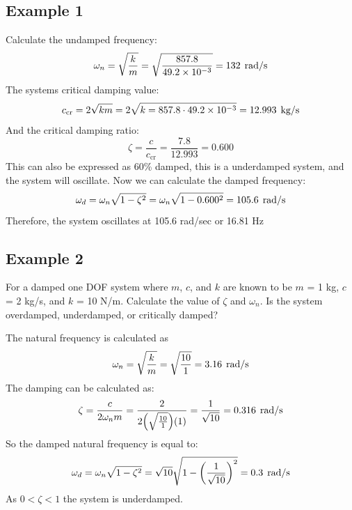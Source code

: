 \documentclass[12pt,a4paper]{article}
\begin{document}
			\subsection*{Example 1} Calculate the undamped frequency:
			\begin{equation}
				\omega_n = \sqrt{\frac{k}{m}}= \sqrt{\frac{857.8}{49.2\times10^{-3}}} = 132 \hspace{1ex}\text{rad/s}
			\end{equation}	
			The systems critical damping value:
			\begin{equation}
				c_{\text{cr}} = 2\sqrt{km}= 2\sqrt{k = 857.8 \cdot 49.2\times10^{-3}} = 12.993 \hspace{1ex}\text{kg/s}
			\end{equation}		
			And the critical damping ratio:
			\begin{equation}
				\zeta = \frac{c}{c_{\text{cr}}} = \frac{7.8}{12.993} = 0.600
			\end{equation}				
			This can also be expressed as 60\% damped, this is a underdamped system, and the system will oscillate. Now we can calculate the damped frequency:
			\begin{equation}
				\omega_d = \omega_n\sqrt{1-\zeta^2} = \omega_n\sqrt{1-0.600^2} = 105.6 \hspace{1ex}\text{rad/s}
			\end{equation}		
			Therefore, the system oscillates at 105.6 rad/sec or 16.81 Hz

		\subsection*{Example 2} 
			For a damped one DOF system where $m$, $c$, and $k$ are known to be $m$ = 1 kg, $c$ = 2 kg/s, and $k$ = 10 N/m. Calculate the value of $\zeta$ and $\omega_n$. Is the system overdamped, underdamped, or critically damped?	
			
			The natural frequency is calculated as
			\begin{equation}
				\omega_n = \sqrt{\frac{k}{m}} = \sqrt{\frac{10}{1}} = 3.16 \hspace{1ex} \text{rad/s}
			\end{equation}
			The damping can be calculated as:
			\begin{equation}
				\zeta = \frac{c}{2\omega_n m} = \frac{2}{2\Big(\sqrt{\frac{10}{1}}\Big)(1)} = \frac{1}{\sqrt{10}} = 0.316 \hspace{1ex} \text{rad/s}
			\end{equation}
			So the damped natural frequency is equal to:
			\begin{equation}
				\omega_d = \omega_n\sqrt{1-\zeta^2} =  \sqrt{10}\sqrt{1-\bigg(\frac{1}{\sqrt{10}}\bigg)^2} = 0.3 \hspace{1ex} \text{rad/s}
			\end{equation}			
			As $0<\zeta<1$ the system is underdamped. 			
\end{document}
